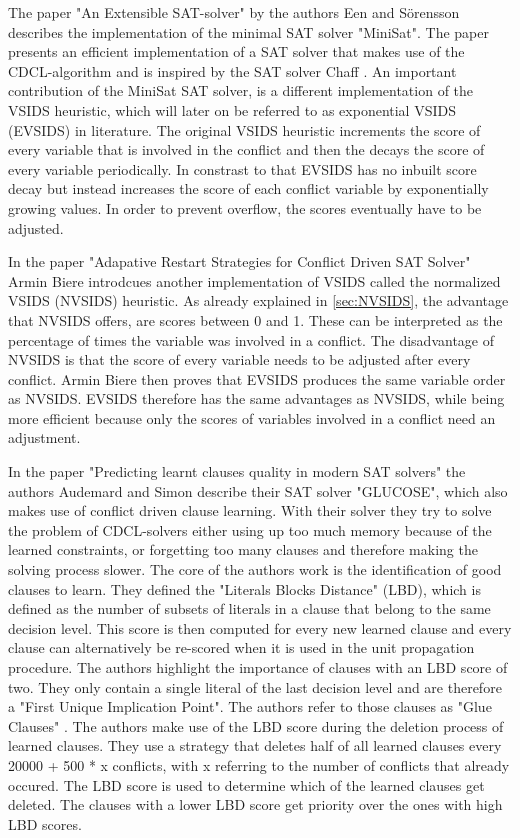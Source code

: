 The paper "An Extensible SAT-solver" \cite{een2003extensible} by the authors Een and Sörensson describes the implementation of the minimal SAT solver "MiniSat". The paper presents an efficient implementation of a SAT solver that makes use of the CDCL-algorithm and is inspired by the SAT solver Chaff \cite{moskewicz2001chaff}. An important contribution of the MiniSat SAT solver, is a different implementation of the VSIDS heuristic, which will later on be referred to as exponential VSIDS (EVSIDS) in literature. The original VSIDS heuristic increments the score of every variable that is involved in the conflict and then the decays the score of every variable periodically. In constrast to that EVSIDS has no inbuilt score decay but instead increases the score of each conflict variable by exponentially growing values. In order to prevent overflow, the scores eventually have to be adjusted.

In the paper "Adapative Restart Strategies for Conflict Driven SAT Solver" \cite{biere2008adaptive} Armin Biere introdcues another implementation of VSIDS called the normalized VSIDS (NVSIDS) heuristic. As already explained in \ref{sec:NVSIDS}, the advantage that NVSIDS offers, are scores between 0 and 1. These can be interpreted as the percentage of times the variable was involved in a conflict. The disadvantage of NVSIDS is that the score of every variable needs to be adjusted after every conflict. Armin Biere then proves that EVSIDS produces the same variable order as NVSIDS. EVSIDS therefore has the same advantages as NVSIDS, while being more efficient because only the scores of variables involved in a conflict need an adjustment.

In the paper "Predicting learnt clauses quality in modern SAT solvers" \cite{audemard2009predicting} the authors Audemard and Simon describe their SAT solver "GLUCOSE", which also makes use of conflict driven clause learning. With their solver they try to solve the problem of CDCL-solvers either using up too much memory because of the learned constraints, or forgetting too many clauses and therefore making the solving process slower. The core of the authors work is the identification of good clauses to learn. They defined the "Literals Blocks Distance" (LBD), which is defined as the number of subsets of literals in a clause that belong to the same decision level. This score is then computed for every new learned clause and every clause can alternatively be re-scored when it is used in the unit propagation procedure. The authors highlight the importance of clauses with an LBD score of two. They only contain a single literal of the last decision level and are therefore a "First Unique Implication Point". The authors refer to those clauses as "Glue Clauses" \cite{audemard2009predicting}. The authors make use of the LBD score during the deletion process of learned clauses. They use a strategy that deletes half of all learned clauses every 20000 + 500 * x conflicts, with x referring to the number of conflicts that already occured. The LBD score is used to determine which of the learned clauses get deleted. The clauses with a lower LBD score get priority over the ones with high LBD scores.

